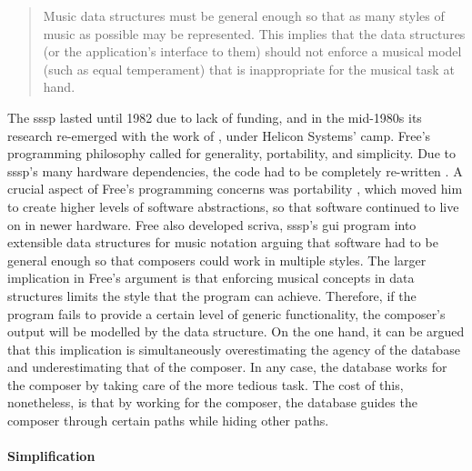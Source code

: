 \begin{quote}
	Music data structures must be general enough so that as many styles of music as possible may be represented. This implies that the data structures (or the application's interface to them) should not enforce a musical model (such as equal temperament) that is inappropriate for the musical task at hand. \parencite[318]{icmc/bbp2372.1987.046}
\end{quote}

The \gls{sssp} lasted until 1982 due to lack of funding, and in the mid-1980s its research re-emerged with the work of \textcites{DBLP:conf/icmc/FreeV86}{icmc/bbp2372.1987.046}{DBLP:conf/icmc/FreeV88}, under Helicon Systems' \gls{camp}. Free's programming philosophy called for generality, portability, and simplicity. Due to \gls{sssp}'s many hardware dependencies, the code had to be completely re-written \parencite{DBLP:conf/icmc/FreeV86}. A crucial aspect of Free's programming concerns was portability , which moved him to create higher levels of software abstractions, so that software continued to live on in newer hardware. Free also developed \gls{scriva}, \gls{sssp}'s \gls{gui} program into extensible data structures for music notation arguing that software had to be general enough so that composers could work in multiple styles. The larger implication in Free's argument is that enforcing musical concepts in data structures limits the style that the program can achieve. Therefore, if the program fails to provide a certain level of generic functionality, the composer's output will be modelled by the data structure. On the one hand, it can be argued that this implication is simultaneously overestimating the agency of the database and underestimating that of the composer. In any case, the database works for the composer by taking care of the more tedious task. The cost of this, nonetheless, is that by working for the composer, the database guides the composer through certain paths while hiding other paths.

\paragraph{Simplification}
\label{computer:vanilla}


